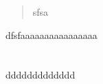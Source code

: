 \documentclass[]{scrartcl}
\title{}
\author{张家毓}
\begin{document}
\maketitle

\begin{abstract}
sfsa
\end{abstract}
dfsfaaaaaaaaaaaaaaaa
\section{}
ddddddddddddd
\end{document}
